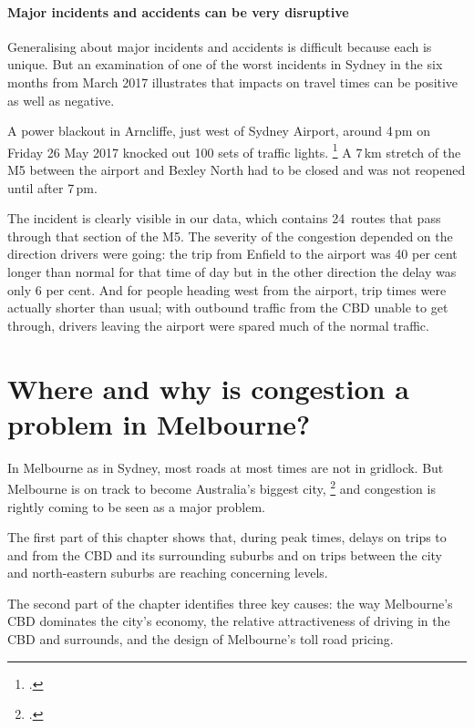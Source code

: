 \documentclass{grattan}
\begin{document}
\subsubsection{Major incidents and accidents can be very disruptive}

Generalising about major incidents and accidents is difficult because each is unique.
But an examination of one of the worst incidents in Sydney in the six months from March 2017 illustrates that impacts on travel times can be positive as well as negative.



A power blackout in Arncliffe, just west of Sydney Airport, around 4\,pm on Friday 26 May 2017 knocked out 100 sets of traffic lights.%
  \footcite{ABC-2017-Arncliffe-blackout}
A 7\,km stretch of the M5 between the airport and Bexley North had to be closed and was not reopened until after 7\,pm.

The incident is clearly visible in our data, which contains 24~routes that pass through that section of the M5.
The severity of the congestion depended on the direction drivers were going: the trip from Enfield to the airport was 40 per cent longer than normal for that time of day
but in the other direction the delay was only 6 per cent.
And for people heading west from the airport, trip times were actually shorter than usual; with outbound traffic from the CBD unable to get through, drivers leaving the airport were spared much of the normal traffic.







\chapter{Where and why is congestion a problem in Melbourne?}\label{chap:Melbourne-congestion}

In Melbourne as in Sydney, most roads at most times are not in gridlock. But Melbourne is on track to become Australia's biggest city,%
    \footcite[][27]{IA-2015-State-of-Australian-Cities-2014-2015}
and congestion is rightly coming to be seen as a major problem.

The first part of this chapter shows that, during peak times, delays on trips to and from the CBD and its surrounding suburbs and on trips between the city and north-eastern suburbs are reaching concerning levels.

The second part of the chapter identifies three key causes: the way Melbourne's CBD dominates the city's economy, the relative attractiveness of driving in the CBD and surrounds, and the design of Melbourne's toll road pricing.
\end{document}
